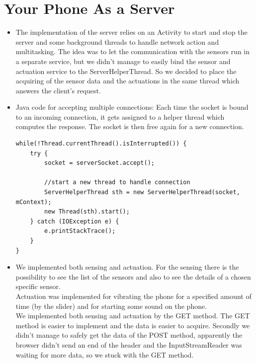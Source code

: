 \documentclass{report}
\begin{document}
\section{Your Phone As a Server}
\begin{itemize}
	\item The implementation of the server relies on an Activity to start and stop the server and some background threads to handle network action and multitasking. The idea was to let the communication with the sensors run in a separate service, but we didn't manage to easily bind the sensor and actuation service to the ServerHelperThread. So we decided to place the acquiring of the sensor data and the actuations in the same thread which answers the client's request.  
	\item Java code for accepting multiple connections: Each time the socket is bound to an incoming connection, it gets assigned to a helper thread which computes the response. The socket is then free again for a new connection.
		\begin{lstlisting}
while(!Thread.currentThread().isInterrupted()) {
	try {
		socket = serverSocket.accept();	
							
		//start a new thread to handle connection
		ServerHelperThread sth = new ServerHelperThread(socket, mContext);
		new Thread(sth).start();
	} catch (IOException e) {
		e.printStackTrace();
	}
}	
		\end{lstlisting}
	\item We implemented both sensing and actuation. For the sensing there is the possibility to see the list of the sensors and also to see the details of a chosen specific sensor. \\
	Actuation was implemented for vibrating the phone for a specified amount of time (by the slider) and for starting some sound on the phone. \\
	We implemented both sensing and actuation by the GET method. The GET method is easier to implement and the data is easier to acquire. Secondly we didn't manage to safely get the data of the POST method, apparently the browser didn't send an end of the header and the InputStreamReader was waiting for more data, so we stuck with the GET method.
\end{itemize}
\end{document}
